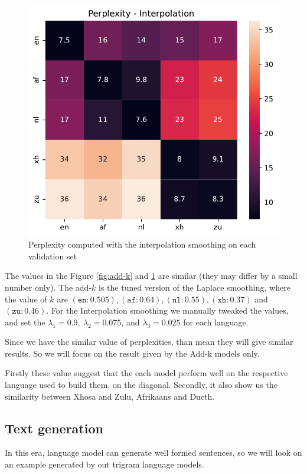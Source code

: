 \begin{figure}[H]
	\centering
	\includegraphics[width=0.5\linewidth]{./figures/inter.pdf}
	\caption{Perplexity computed with the interpolation smoothing on each validation set}
	\label{fig:interp}
\end{figure}
The values in the Figure \ref{fig:add-k} and \ref{fig:interp} are  similar (they may differ by a small number only).
The add-$k$ is the tuned version of the Laplace smoothing, where the value of $k$ are
$(\mathtt{en}: 0.505),
	(\mathtt{af}: 0.64),
	(\mathtt{nl}: 0.55),
	(\mathtt{xh}: 0.37)$ and
	$(\mathtt{zu}: 0.46)$. For the Interpolation smoothing we manually tweaked the values, and set the $\lambda_1=0.9,\ \lambda_2=0.075$, and $\lambda_3 = 0.025$ for each language.

Since we have the similar value of perplexities, than mean they will give similar results. So we will focus on the result given by the Add-k models only.


Firstly these value suggest that the each model perform well on the respective language used to build them, on the diagonal. Secondly, it also show us the similarity between Xhosa and Zulu, Afrikaans and Ducth.

\subsection{Text generation}
In this era, language model can generate well formed sentences, so we will look on an example generated by out trigram language models.

